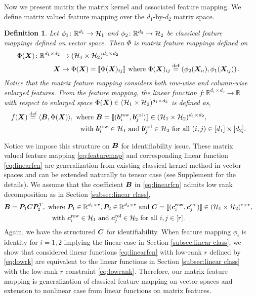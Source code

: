 \documentclass[mathptm]{statsoc}
\newtheorem{defn}{Definition}
\begin{document}
Now we present matrix the matrix kernel and associated feature mapping.
We define matrix valued feature mapping over  the $d_1$-by-$d_2$ matrix space.
\begin{defn}\label{def:map}
Let $\phi_1\colon\mathbb{R}^{d_1}\rightarrow \mathcal{H}_1 $ and $\phi_2\colon\mathbb{R}^{d_2}\rightarrow \mathcal{H}_2 $  be classical feature mappings defined on vector space. Then $\Phi$ is matrix feature mappings defined on
\begin{align}\label{eq:featuremap}
    \Phi(\bm X)\colon \mathbb{R}^{d_1\times d_2} &\rightarrow (\mathcal{H}_1\times \mathcal{H}_2)^{d_1\times d_2}\\
    \bm X &\mapsto \Phi(\bm X) = \llbracket \Phi(\bm X)_{ij} \rrbracket\text{ where } \Phi(\bm X)_{ij}\stackrel{\text{def}}{=}\left(\phi_2(\bm X_{i:}),\phi_1(\bm X_{:j})\right).
\end{align}
Notice that the matrix feature mapping considers both row-wise and column-wise enlarged features.
From the feature mapping, the linear function $f\colon \mathbb{R}^{d_1\times d_2}\rightarrow \mathbb{R}$ with respect to enlarged space $\Phi(\bm X)\in(\mathcal{H}_1\times \mathcal{H}_2)^{d_1\times d_2}$ is defined as,
\begin{align}\label{eq:linearfcn}
    f(\bm X) \stackrel{\text{def}}{=}\langle \bm B,\Phi(\bm X) \rangle ,\text{ where }& \bm B=\llbracket (\bm{b}^{\text{row}}_i,\bm{b}^{\text{col}}_j) \rrbracket\in(\mathcal{H}_1\times \mathcal{H}_2)^{d_1\times d_2},\\\text{ with }& \bm{b}^{\text{row}}_i\in\mathcal{H}_1\text{ and } \bm{b}^{\text{col}}_j\in\mathcal{H}_2 \text{ for all } (i,j)\in[d_1]\times[d_2].
\end{align}
\end{defn}
Notice we impose this structure on $\bm B$ for identifiability issue.
These matrix valued feature mapping \eqref{eq:featuremap} and corresponding linear function \eqref{eq:linearfcn} are generalization from existing classical kernel method in vector spaces and can be extended naturally to tensor case (see Supplement for the details).
 We assume that the coefficient $\bm B$ in \eqref{eq:linearfcn} admits low rank decomposition as in Section \ref{subsec:linear class}, 
 \begin{align}\label{eq:lowrk}
     \bm B = \bm{P}_1\bm C\bm{P}_2^T,\text{ where }& \bm{P}_1\in\mathbb{R}^{d_1\times r},\bm{P}_2\in\mathbb{R}^{d_2\times r} \text{ and } \bm C = \llbracket (\bm{c}_i^{\text{row}},\bm{c}_j^{\text{col}}) \rrbracket\in(\mathcal{H}_1\times \mathcal{H}_2)^{r\times r},\\
     \text{ with }&\bm{c}^{\text{row}}_i\in\mathcal{H}_1\text{ and } \bm{c}^{\text{col}}_j\in\mathcal{H}_2 \text{ for all } i,j\in[r].
 \end{align}
 Again, we have the structured $\bm C$ for identifiability. 
  When feature mapping $\phi_i$ is identity for $i=1,2$ implying the linear case in Section \ref{subsec:linear class}, we show that considered linear functions \eqref{eq:linearfcn} with low-rank $r$ defined by \eqref{eq:lowrk} are equivalent to the linear functions in Section \ref{subsec:linear class} with the low-rank $r$ constraint \eqref{eq:lowrank}.
  Therefore, our matrix feature mapping is generalization of classical feature mapping on vector spaces and extension to nonlinear case from linear functions on matrix features.
  
\end{document}
